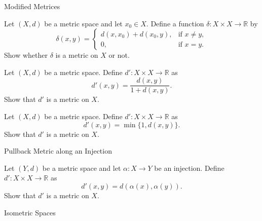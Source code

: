 \documentclass[12pt, a4paper]{article}
\begin{document}
\clearpage

\begin{heading}
    Modified Metrices
\end{heading}

\vspace{10pt}

\begin{theorem}
Let $(X,d)$ be a metric space and let $x_0\in X$. Define a function
$\delta : X\times X \to \mathbb{R}$ by
\[
\delta(x,y)=
\begin{cases}
d(x,x_0)+d(x_0,y), & \text{if } x\neq y,\\[4pt]
0, & \text{if } x=y.
\end{cases}
\]
Show whether $\delta$ is a metric on $X$ or not.
\end{theorem}

\clearpage

\begin{theorem}
    Let $(X,d)$ be a metric space. Define $d':X\times X\to\mathbb{R}$ as
    \[
        d'(x,y)=\frac{d(x,y)}{1+d(x,y)}.
    \]
    Show that $d'$ is a metric on $X$.
\end{theorem}

\clearpage

\begin{theorem}
    Let $(X,d)$ be a metric space. Define $d':X\times X\to\mathbb{R}$ as
    \[
        d'(x,y)=\min\{1,d(x,y)\}.
    \]
    Show that $d'$ is a metric on $X$.
\end{theorem}

\clearpage

\begin{heading}
    Pullback Metric along an Injection
\end{heading}

\vspace{10pt}

\begin{theorem}
    Let $(Y,d)$ be a metric space and let $\alpha:X\to Y$ be an injection. Define
    $d':X\times X\to\mathbb{R}$ as
    \[    d'(x,y)=d(\alpha(x),\alpha(y)).\]
    Show that $d'$ is a metric on $X$.
\end{theorem}

\clearpage

\begin{heading}
    Isometric Spaces
\end{heading}
\end{document}

